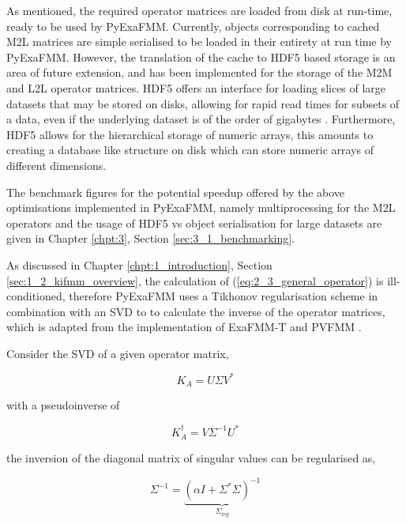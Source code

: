 As mentioned, the required operator matrices are loaded from disk at run-time, ready to
be used by \gls{PyExaFMM}. Currently, objects corresponding to cached \gls{M2L}
matrices are simple serialised to be loaded in their entirety at run time by
\gls{PyExaFMM}. However, the translation of the cache to HDF5 based storage is
an area of future extension, and has been implemented
for the storage of the \gls{M2M} and \gls{L2L} operator matrices. HDF5 offers an
interface for loading slices of large datasets that may be stored on disks, allowing
for rapid read times for subsets of a data, even if the underlying dataset
is of the order of gigabytes \cite{Wasser:NSF}. Furthermore, HDF5 allows for the
hierarchical storage of numeric arrays, this amounts to creating
a database like structure on disk which can store numeric arrays of different
dimensions.

The  benchmark figures for the potential speedup offered by the above optimisations
implemented in \gls{PyExaFMM}, namely multiprocessing for the \gls{M2L} operators
and the usage of HDF5 vs object serialisation for large datasets are given
in Chapter \ref{chpt:3}, Section \ref{sec:3_1_benchmarking}.

As discussed in Chapter \ref{chpt:1_introduction}, Section \ref{sec:1_2_kifmm_overview},
the calculation of (\ref{eq:2_3_general_operator}) is ill-conditioned, therefore
\gls{PyExaFMM} uses a Tikhonov regularisation scheme in combination with an SVD
to to calculate the inverse of the operator matrices, which is adapted from the
implementation of ExaFMM-T and PVFMM \cite{Malhotra:2015:CCP, exafmm}.

Consider the SVD of a given operator matrix,

\begin{equation}
    K_A = U \Sigma V^*
\end{equation}

with a pseudoinverse of

\begin{equation}
    K_A^\dagger = V \Sigma^{-1} U^*
\end{equation}

the inversion of the diagonal matrix of singular values can be regularised as,

\begin{equation}
    \Sigma^{-1} = \underbrace{(\alpha I + \Sigma^*\Sigma)^{-1}}_{\Sigma_{\text{reg}}}
    \label{eq:2_4_regularised_general_operator}
\end{equation}

